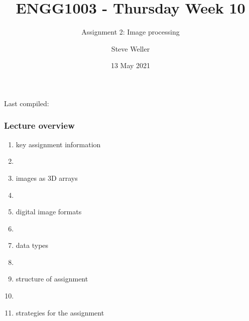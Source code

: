 \documentclass[english,14pt]{beamer}
\title{ENGG1003 - Thursday Week 10}
\subtitle{Assignment 2: Image processing}
\author{Steve Weller}
\institute{University of Newcastle}
\date{13 May 2021}
\begin{document}
\begin{flushleft}
{\scriptsize Last compiled:~\DTMnow}
\vspace*{-5mm}
\end{flushleft}
\framebreak


\begin{frame}[fragile]

\frametitle{Lecture overview}
\begin{enumerate}
	\item key assignment information

	\item[]

	\item images as 3D arrays
	
	\item[]

	\item digital image formats

	\item[]

	\item data types

	\item[]

	\item structure of assignment

	\item[]

	\item strategies for the assignment

\end{enumerate}

\end{frame}

\end{document}
